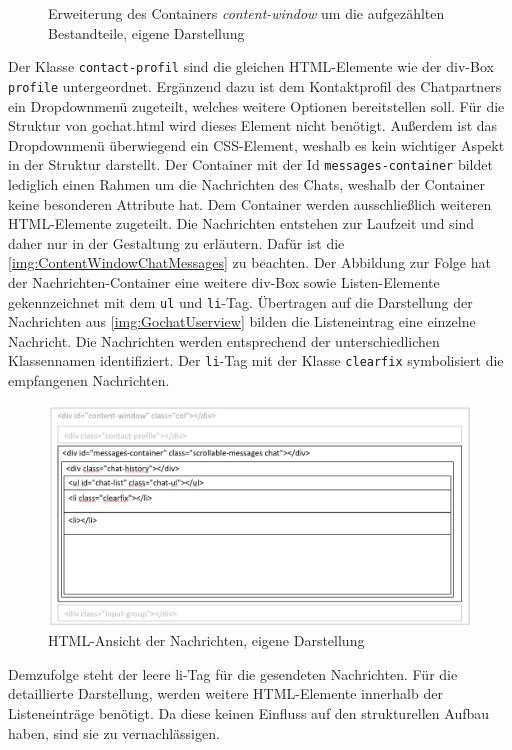 \documentclass[a4paper,titlepage,halfparskip,12pt]{scrreprt}
\begin{document}
\begin{onehalfspacing}
\begin{figure}[h]
	\caption{Erweiterung des Containers \textit{content-window} um die aufgezählten Bestandteile, eigene Darstellung}
	\label{img:Content-window}
\end{figure}
Der Klasse \texttt{contact-profil} sind die gleichen HTML-Elemente wie der div-Box \texttt{profile} untergeordnet. Ergänzend dazu ist dem Kontaktprofil des Chatpartners ein Dropdownmenü zugeteilt, welches weitere Optionen bereitstellen soll. Für die Struktur von gochat.html wird dieses Element nicht benötigt. Außerdem ist das Dropdownmenü überwiegend ein CSS-Element, weshalb es kein wichtiger Aspekt in der Struktur darstellt. Der Container mit der Id \texttt{messages-container} bildet lediglich einen Rahmen um die Nachrichten des Chats, weshalb der Container keine besonderen Attribute hat. Dem Container werden ausschließlich weiteren HTML-Elemente zugeteilt. Die Nachrichten entstehen zur Laufzeit und sind daher nur in der Gestaltung zu erläutern. Dafür ist die \autoref{img:ContentWindowChatMessages} zu beachten. Der Abbildung zur Folge hat der Nachrichten-Container eine weitere div-Box sowie Listen-Elemente gekennzeichnet mit dem \texttt{ul} und \texttt{li}-Tag. Übertragen auf die Darstellung der Nachrichten aus \autoref{img:GochatUserview} bilden die Listeneintrag eine einzelne Nachricht. Die Nachrichten werden entsprechend der unterschiedlichen Klassennamen identifiziert. Der \texttt{li}-Tag mit der Klasse \texttt{clearfix} symbolisiert die empfangenen Nachrichten.
\begin{figure}[h]
	\centering
	\includegraphics[scale=0.45]{images/ContentWindowChatMessages}
	\caption{HTML-Ansicht der Nachrichten, eigene Darstellung}
	\label{img:ContentWindowChatMessages}
\end{figure}
Demzufolge steht der leere li-Tag für die gesendeten Nachrichten. Für die detaillierte Darstellung, werden weitere HTML-Elemente innerhalb der Listeneinträge benötigt. Da diese keinen Einfluss auf den strukturellen Aufbau haben, sind sie zu vernachlässigen.\\

\end{onehalfspacing}
\end{document}
